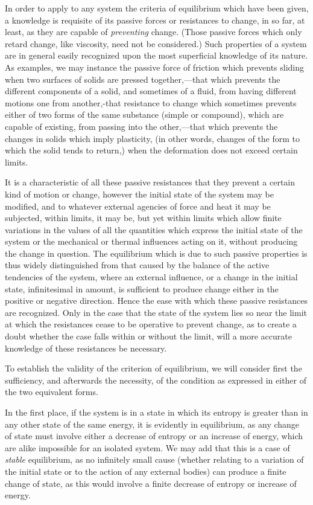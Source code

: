 \documentclass[12pt]{memoir}
\begin{document}
%
In order to apply to any system the criteria of equilibrium which have been given, a knowledge is requisite of its passive forces or resistances to change, in so far, at least, as they are capable of \textit{preventing} change. (Those passive forces which only retard change, like viscosity, need not be considered.) Such properties of a system are in general easily recognized upon the most superficial knowledge of its nature. As examples, we may instance the passive force of friction which prevents sliding when two surfaces of solids are pressed together,---that which prevents the different components of a solid, and sometimes of a fluid, from having different motions one from another,-that resistance to change which sometimes prevents either of two forms of the same substance (simple or compound), which are capable of existing, from passing into the other,---that which prevents the changes in solids which imply plasticity, (in other words, changes of the form to which the solid tends to return,) when the deformation does not exceed certain limits.

It is a characteristic of all these passive resistances that they prevent a certain kind of motion or change, however the initial state of the system may be modified, and to whatever external agencies of force and heat it may be subjected, within limits, it may be, but yet within limits which allow finite variations in the values of all the quantities which express the initial state of the system or the mechanical or thermal influences acting on it, without producing the change in question. The equilibrium which is due to such passive properties is thus widely distinguished from that caused by the balance of the active tendencies of the system, where an external influence, or a change in the initial state, infinitesimal in amount, is sufficient to produce change either in the positive or negative direction. Hence the ease with which these passive resistances are recognized. Only in the case that the state of the system lies so near the limit at which the resistances cease to be operative to prevent change, as to create a doubt whether the case falls within or without the limit, will a more accurate knowledge of these resistances be necessary.

To establish the validity of the criterion of equilibrium, we will consider first the sufficiency, and afterwards the necessity, of the condition as expressed in either of the two equivalent forms.

In the first place, if the system is in a state in which its entropy is greater than in any other state of the same energy, it is evidently in equilibrium, as any change of state must involve either a decrease of entropy or an increase of energy, which are alike impossible for an isolated system. We may add that this is a case of \textit{stable} equilibrium, as no infinitely small cause (whether relating to a variation of the initial state or to the action of any external bodies) can produce a finite change of state, as this would involve a finite decrease of entropy or increase of energy.
\end{document}
